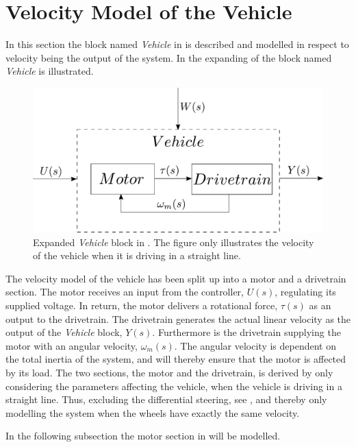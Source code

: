 \section{Velocity Model of the Vehicle}
In this section the block named \textit{Vehicle} in   is described and modelled in respect to velocity being the output of the system. In  the expanding of the block named \textit{Vehicle} is illustrated.

\begin{figure}[H]
	\centering
	\includegraphics[scale=0.6]{figures/plantopen.pdf}
	\caption{Expanded \textit{Vehicle} block in  . The figure only illustrates the velocity of the vehicle when it is driving in a straight line.}
	\label{fig:Velocitymodelplantopen}
\end{figure}


The velocity model of the vehicle has been split up into a motor and a drivetrain section. The motor receives an input from the controller, $U(s)$, regulating its supplied voltage. In return, the motor delivers a rotational force, $\tau(s)$ as an output to the drivetrain. The drivetrain generates the actual linear velocity as the output of the \textit{Vehicle} block, $Y(s)$. Furthermore is the drivetrain supplying the motor with an angular velocity, $\omega_m(s)$. The angular velocity  is dependent on the total inertia of the system, and will thereby ensure that the motor is affected by its load. The two sections, the motor and the drivetrain, is derived by only considering the parameters affecting the vehicle, when the vehicle is driving in a straight line. Thus, excluding the differential steering, see , and thereby only modelling the system when the wheels have exactly the same velocity.

In the following subsection the motor section in  will be modelled.
